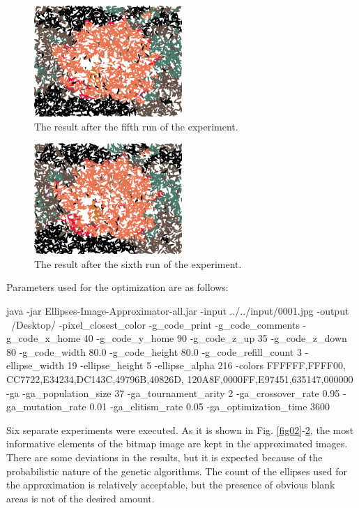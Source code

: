 \documentclass[conference]{IEEEtran}
\begin{document}
\begin{figure}[htbp]
\centerline{\includegraphics[width=0.5\textwidth]{fig06.png}}
\caption{The result after the fifth run of the experiment.}
\label{fig06}
\end{figure}

\begin{figure}[htbp]
\centerline{\includegraphics[width=0.5\textwidth]{fig07.png}}
\caption{The result after the sixth run of the experiment.}
\label{fig07}
\end{figure}

Parameters used for the optimization are as follows:

\begin{verbnobox}[\small]
java -jar Ellipses-Image-Approximator-all.jar 
-input ../../input/0001.jpg -output ~/Desktop/ 
-pixel_closest_color -g_code_print 
-g_code_comments -g_code_x_home 40 
-g_code_y_home 90 -g_code_z_up 35 
-g_code_z_down 80 -g_code_width 80.0 
-g_code_height 80.0 -g_code_refill_count 3 
-ellipse_width 19 -ellipse_height 5 
-ellipse_alpha 216 -colors FFFFFF,FFFF00,
CC7722,E34234,DC143C,49796B,40826D,
120A8F,0000FF,E97451,635147,000000 -ga 
-ga_population_size 37 -ga_tournament_arity 2 
-ga_crossover_rate 0.95 -ga_mutation_rate 0.01 
-ga_elitism_rate 0.05 -ga_optimization_time 3600
\end{verbnobox}

Six separate experiments were executed. As it is shown in Fig. \ref{fig02}-\ref{fig07}, the most informative elements of the bitmap image are kept in the approximated images. There are some deviations in the results, but it is expected because of the probabilistic nature of the genetic algorithms. The count of the ellipses used for the approximation is relatively acceptable, but the presence of obvious blank areas is not of the desired amount. 
\end{document}
